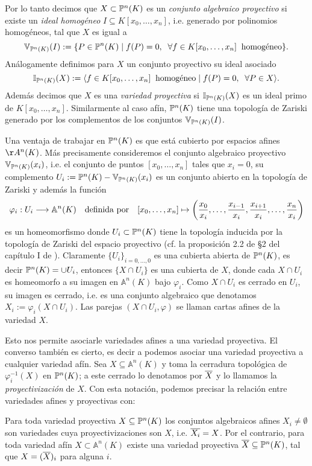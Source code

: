 \documentclass[../../tesis_maestria]{subfiles}
\begin{document}
Por lo tanto decimos que $X\subset\mathbb{P}^n(K)$ es un \emph{conjunto algebraico proyectivo} si existe un \emph{ideal homogéneo} $I\subseteq K[x_0,\ldots,x_n]$, i.e. generado por polinomios homogéneos, tal que $X$ es igual a
\[
	\mathbb{V}_{\mathbb{P}^n(K)}(I):=\{P\in\mathbb{P}^n(K)\mid f(P)=0,\;\;\forall f\in K[x_0,\ldots,x_n]\;\;\text{homogéneo}\}.
\]
Análogamente definimos para $X$ un conjunto proyectivo su ideal asociado
\[
	\mathbb{I}_{\mathbb{P}^n(K)}(X):=\langle f\in K[x_0,\ldots,x_n]\;\;\text{homogéneo}\mid f(P)=0,\;\;\forall P\in X \rangle.
\]
Además decimos que $X$ es una \emph{variedad proyectiva} si $\mathbb{I}_{\mathbb{P}^n(K)}(X)$ es un ideal primo de $K[x_0,\ldots,x_n]$. Similarmente al caso afín, $\mathbb{P}^n(K)$ tiene una topología de Zariski generado por los complementos de los conjuntos $\mathbb{V}_{\mathbb{P}^n(K)}(I)$.

Una ventaja de trabajar en $\mathbb{P}^n(K)$ es que está cubierto por espacios afines $\AA^n(K)$. Más precisamente consideremos el conjunto algebraico proyectivo $\mathbb{V}_{\mathbb{P}^n(K)}(x_i)$, i.e. el conjunto de puntos $[x_0,\ldots,x_n]$ tales que $x_i=0$, su complemento $U_i:=\mathbb{P}^n(K)-\mathbb{V}_{\mathbb{P}^n(K)}(x_i)$ es un conjunto abierto en la topología de Zariski y además la función
\[
	\varphi_i:U_i\longrightarrow\mathbb{A}^n(K)\quad\text{definida por}\quad [x_0,\ldots,x_n]\mapsto \left( \frac{x_0}{x_i},\ldots,\frac{x_{i-1}}{x_i},\frac{x_{i+1}}{x_i},\ldots,\frac{x_n}{x_i} \right)
\]
es un homeomorfismo donde $U_i\subset\mathbb{P}^n(K)$ tiene la topología inducida por la topología de Zariski del espacio proyectivo (cf. la proposición 2.2 de \S2 del capítulo I de \cite{HartshorneAG}). Claramente $\{U_i\}_{i=0,\ldots,0}$ es una cubierta abierta de $\mathbb{P}^n(K)$, es decir $\mathbb{P}^n(K)=\cup U_i$, entonces $\{X\cap U_i\}$ es una cubierta de $X$, donde cada $X\cap U_i$ es homeomorfo a su imagen en $\mathbb{A}^n(K)$ bajo $\varphi_i$. Como $X\cap U_i$ es cerrado en $U_i$, su imagen es cerrado, i.e. es una conjunto algebraico que denotamos $X_i:=\varphi_i(X\cap U_i)$. Las parejas $(X\cap U_i,\varphi)$ se llaman cartas afines de la variedad $X$.

Esto nos permite asociarle variedades afines a una variedad proyectiva. El converso también es cierto, es decir a podemos asociar una variedad proyectiva a cualquier variedad afín. Sea $X\subseteq\mathbb{A}^n(K)$ y toma la cerradura topológica de $\varphi_i^{-1}(X)$ en $\mathbb{P}^n(K)$; a este cerrado lo denotamos por $\overline{X}$ y lo llamamos la \emph{proyectivización} de $X$. Con esta notación, podemos precisar la relación entre variedades afines y proyectivas con:

\begin{prop}
Para toda variedad proyectiva $X\subseteq\mathbb{P}^n(K)$ los conjuntos algebraicos afines $X_i\neq\emptyset$ son variedades cuya proyectivizaciones son $X$, i.e. $\overline{X_i}=X$.	Por el contrario, para toda variedad afín $X\subset\mathbb{A}^n(K)$ existe una variedad proyectiva $\overline{X}\subseteq\mathbb{P}^n(K)$, tal que $X=(\overline{X})_i$ para alguna $i$.
\end{prop}
\end{document}
